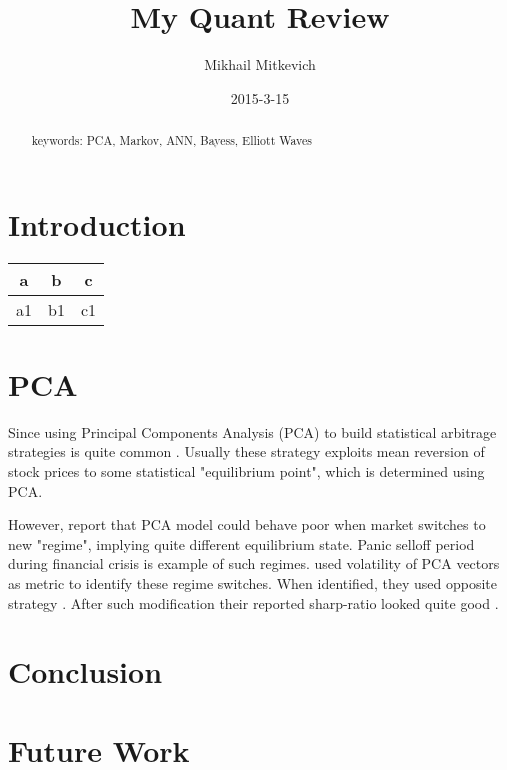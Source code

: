 \documentclass[a4paper,11pt]{article}
\begin{document}
\title{My Quant Review}
\author{Mikhail Mitkevich}
\date{2015-3-15}


\maketitle

\begin{abstract}
keywords: PCA, Markov, ANN, Bayess, Elliott Waves
\end{abstract}

\section{Introduction}
\begin{tabular}{|c|c|c|}
\hline a & b & c \\ 
\hline a1 & b1 &  c1\\ 
\hline 
\end{tabular} 

\section{PCA}

Since \cite{avellaneda2010statistical} using Principal Components Analysis (PCA) to build statistical arbitrage  strategies is quite common .
Usually these strategy exploits mean reversion of stock prices to some statistical "equilibrium point", which is determined using PCA.

However, \cite{infantino2010} report that PCA model could behave poor when market switches to new "regime", implying quite different equilibrium state. 
Panic selloff period during financial crisis is example of such regimes. 
\cite{infantino2010} used volatility of PCA vectors as metric to identify these regime switches.
When identified, they used opposite strategy .
After such modification their reported sharp-ratio looked quite good .




\section{Conclusion}

\section{Future Work}

\todos



\end{document}
